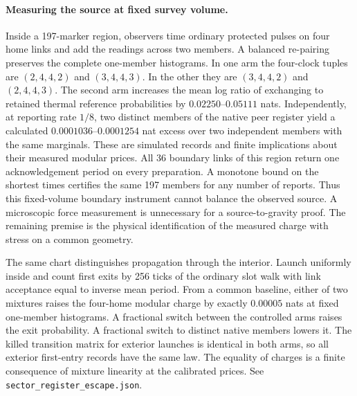 \documentclass[11pt]{article}
\begin{document}
\paragraph{Measuring the source at fixed survey volume.}
Inside a 197-marker region, observers time ordinary protected pulses on
four home links and add the readings across two members. A balanced
re-pairing preserves the complete one-member histograms. In one arm
the four-clock tuples are \((2,4,4,2)\) and \((3,4,4,3)\).
In the other they are \((3,4,4,2)\) and \((2,4,4,3)\).
The second arm increases the mean log ratio of exchanging to retained
thermal reference probabilities by \(0.02250\)--\(0.05111\) nats.
Independently, at reporting rate \(1/8\), two distinct members of the
native peer register yield a calculated \(0.0001036\)--\(0.0001254\)
nat excess over two independent members with the same marginals.
These are simulated records and finite implications about their
measured modular prices. All 36 boundary links of this region return
one acknowledgement period on every preparation. A monotone bound on
the shortest times certifies the same 197 members for any number of
reports. Thus this fixed-volume boundary instrument cannot balance
the observed source. A microscopic force measurement is unnecessary
for a source-to-gravity proof. The remaining premise is the physical
identification of the measured charge with stress on a common geometry.

The same chart distinguishes propagation through the interior.
Launch uniformly inside and count first exits by 256 ticks of the
ordinary slot walk with link acceptance equal to inverse mean period.
From a common baseline, either of two mixtures raises the four-home
modular charge by exactly \(0.00005\) nats at fixed one-member
histograms. A fractional switch between the controlled arms raises
the exit probability. A fractional switch to distinct native members
lowers it. The killed transition matrix for exterior launches is
identical in both arms, so all exterior first-entry records have the
same law. The equality of charges is a finite consequence of mixture
linearity at the calibrated prices. See
\texttt{sector\_register\_escape.json}.
\end{document}
